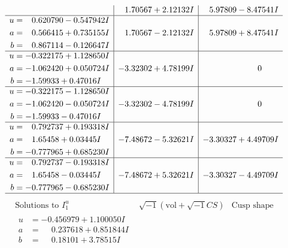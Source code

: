\documentclass[1p]{elsarticle_modified}
\theoremstyle{definition}
\newcommand{\I}{\sqrt{-1}}
\begin{document}
$$\begin{array}{c|c|c}
 & \phantom{-}1.70567 + 2.12132 I & \phantom{-}5.97809 - 8.47541 I \\ \hline\begin{aligned}
u &= \phantom{-}0.620790 - 0.547942 I \\
a &= \phantom{-}0.566415 + 0.735155 I \\
b &= \phantom{-}0.867114 - 0.126647 I\end{aligned}
 & \phantom{-}1.70567 - 2.12132 I & \phantom{-}5.97809 + 8.47541 I \\ \hline\begin{aligned}
u &= -0.322175 + 1.128650 I \\
a &= -1.062420 + 0.050724 I \\
b &= -1.59933 + 0.47016 I\end{aligned}
 & -3.32302 + 4.78199 I & \phantom{-0.000000 } 0 \\ \hline\begin{aligned}
u &= -0.322175 - 1.128650 I \\
a &= -1.062420 - 0.050724 I \\
b &= -1.59933 - 0.47016 I\end{aligned}
 & -3.32302 - 4.78199 I & \phantom{-0.000000 } 0 \\ \hline\begin{aligned}
u &= \phantom{-}0.792737 + 0.193318 I \\
a &= \phantom{-}1.65458 + 0.03445 I \\
b &= -0.777965 + 0.685230 I\end{aligned}
 & -7.48672 - 5.32621 I & -3.30327 + 4.49709 I \\ \hline\begin{aligned}
u &= \phantom{-}0.792737 - 0.193318 I \\
a &= \phantom{-}1.65458 - 0.03445 I \\
b &= -0.777965 - 0.685230 I\end{aligned}
 & -7.48672 + 5.32621 I & -3.30327 - 4.49709 I\\
 \hline 
 \end{array}$$\newpage$$\begin{array}{c|c|c}  
\text{Solutions to }I^u_{1}& \I (\text{vol} + \sqrt{-1}CS) & \text{Cusp shape}\\
 \hline 
\begin{aligned}
u &= -0.456979 + 1.100050 I \\
a &= \phantom{-}0.237618 + 0.851844 I \\
b &= \phantom{-}0.18101 + 3.78515 I\end{aligned}

\end{array}$$
\end{document}
